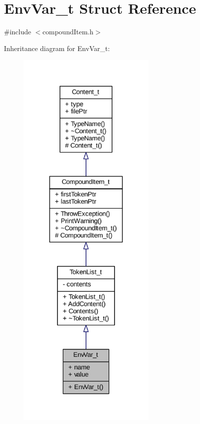 \hypertarget{struct_env_var__t}{}\section{Env\+Var\+\_\+t Struct Reference}
\label{struct_env_var__t}


{\ttfamily \#include $<$compound\+Item.\+h$>$}



Inheritance diagram for Env\+Var\+\_\+t\+:
\nopagebreak
\begin{figure}[H]
\begin{center}
\leavevmode
\includegraphics[height=550pt]{struct_env_var__t__inherit__graph}
\end{center}
\end{figure}


